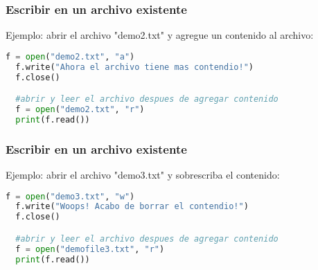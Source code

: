 \begin{frame}[fragile]
  \frametitle{Escribir en un archivo existente}

  Ejemplo: abrir el archivo "demo2.txt" y agregue un
  contenido al archivo: 

  \vspace{\baselineskip}
  \begin{lstlisting}[language=Python]
  f = open("demo2.txt", "a")
  f.write("Ahora el archivo tiene mas contendio!")
  f.close()

  #abrir y leer el archivo despues de agregar contenido
  f = open("demo2.txt", "r")
  print(f.read()) 
  \end{lstlisting}
\end{frame}

\begin{frame}[fragile]
  \frametitle{Escribir en un archivo existente}

  Ejemplo: abrir el archivo "demo3.txt" y sobrescriba el
  contenido: 

  \vspace{\baselineskip}
  \begin{lstlisting}[language=Python]
  f = open("demo3.txt", "w")
  f.write("Woops! Acabo de borrar el contendio!")
  f.close()

  #abrir y leer el archivo despues de agregar contenido
  f = open("demofile3.txt", "r")
  print(f.read())
  \end{lstlisting}
\end{frame}
